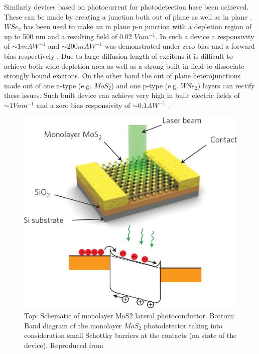 Similarly devices based on photocurrent for photodetection hase been achieved. These can be made by creating a junction both out of plane \cite{Withers2015}\cite{Cheng2014} as well as in plane \cite{Ross2014}\cite{Fontana2013}. $WSe_2$ has been used to make an in plane p-n junction with a depletion region of up to 500 nm and a resulting field of 0.02 $V nm^{-1}$.  In such a device a responsivity of $\sim 1 mAW^{-1}$ and $\sim 200 mAW^{-1}$ was demonstrated under zero bias and a forward bias respectively \cite{Baugher2014}. Due to large diffusion length of excitons it is difficult to achieve both wide depletion area as well as a strong built in field to dissociate strongly bound excitons. On the other hand the out of plane heterojunctions made out of one n-type (e.g. $MoS_2$) and one p-type (e.g. $WSe_2$) layers can rectify these issues. Such built device can achieve very high in built electric fields of $\sim 1 V nm^{-1}$ and a zero bias responsivity of $\sim 0.1 A W^{-1}$ \cite{Cheng2014}\cite{Lee2014}. 

\begin{figure}[!h]
	\begin{center}
		\includegraphics[scale=0.35]{PhotodetectorDiagram.png}
		\caption{Top: Schematic of monolayer MoS2 lateral photoconductor. Bottom: Band diagram of
the monolayer $MoS_2$ photodetector taking into consideration small Schottky barriers at the contacts (on state of the device). Reproduced from \cite{Mak2016}}
		\label{fig:PhotodetectorDiagram}
	\end{center}
\end{figure}

